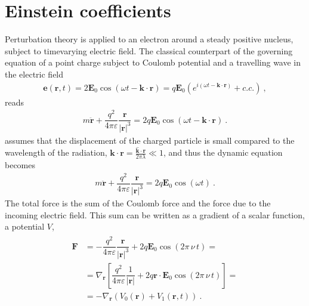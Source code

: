 \documentclass[letterpaper,10pt,english]{jupyterBook}
\begin{document}
\section{Einstein coefficients}
\label{\detokenize{ch/quantum-mechanics/einstein-coeffs-interaction-picture:einstein-coefficients}}\label{\detokenize{ch/quantum-mechanics/einstein-coeffs-interaction-picture:quantum-mechanics-einstein-coeffs-interaction-picture-einstein-coeffs}}
\sphinxAtStartPar
Perturbation theory is applied to an electron around a steady positive nucleus, subject to time\sphinxhyphen{}varying electric field. The classical counterpart of the governing equation of a point charge subject to Coulomb potential and a travelling wave in the electric field
\begin{equation*}
\begin{split}\mathbf{e}(\mathbf{r},t) = 2 \mathbf{E}_0 \cos( \omega t - \mathbf{k} \cdot \mathbf{r} ) = q \mathbf{E}_0 ( e^{i(\omega t - \mathbf{k}\cdot \mathbf{r})} + c.c. ) \ , \end{split}
\end{equation*}
\sphinxAtStartPar
reads
\begin{equation*}
\begin{split}m \ddot{\mathbf{r}} + \dfrac{q^2}{4 \pi \varepsilon} \dfrac{\mathbf{r}}{|\mathbf{r}|^3} = 2 q \mathbf{E}_0 \cos(\omega t - \mathbf{k} \cdot \mathbf{r}) \ .\end{split}
\end{equation*}
\sphinxAtStartPar
{} assumes that the displacement of the charged particle is small compared to the wave\sphinxhyphen{}length of the radiation, \(\mathbf{k} \cdot \mathbf{r} = \frac{ \hat{\mathbf{k}} \cdot \mathbf{r} }{2 \pi \lambda} \ll 1\), and thus the dynamic equation becomes
\begin{equation*}
\begin{split}m \ddot{\mathbf{r}} + \dfrac{q^2}{4 \pi \varepsilon} \dfrac{\mathbf{r}}{|\mathbf{r}|^3} = 2 q \mathbf{E}_0 \cos(\omega t) \ .\end{split}
\end{equation*}
\sphinxAtStartPar
The total force is the sum of the Coulomb force and the force due to the incoming electric field. This sum can be written as a gradient of a scalar function, a potential \(V\),
\begin{equation*}
\begin{split}\begin{aligned}
  \mathbf{F} 
  & = - \dfrac{q^2}{4 \pi \varepsilon} \dfrac{\mathbf{r}}{|\mathbf{r}|^3} + 2 q \mathbf{E}_0 \cos(2 \pi \, \nu \, t) = \\
  & = \nabla_{\mathbf{r}} \left[ \dfrac{q^2}{4 \pi \varepsilon}\dfrac{1}{|\mathbf{r}|} + 2 q \mathbf{r} \cdot \mathbf{E}_0 \cos(2 \pi \, \nu \, t) \right] = \\
  & = - \nabla_{\mathbf{r}} \left( V_0(\mathbf{r}) + V_1(\mathbf{r},t) \right) \ .
\end{aligned}\end{split}
\end{equation*}
\end{document}
